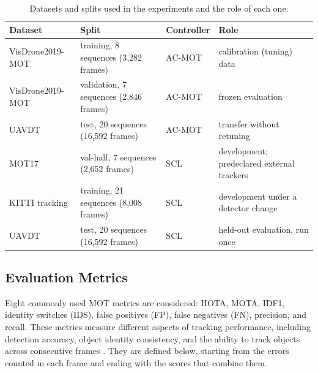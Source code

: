 \begin{table}[tbp]
\centering
\caption{Datasets and splits used in the experiments and the role of each one.}
\label{tab:res-data}
\begin{tabular}{>{\raggedright\arraybackslash}p{3.0cm}>{\raggedright\arraybackslash}p{4.8cm}>{\raggedright\arraybackslash}p{1.7cm}>{\raggedright\arraybackslash}p{4.8cm}}
\toprule
Dataset & Split & Controller & Role\\
\midrule
VisDrone2019-MOT & training, 8 sequences (3,282 frames) & AC-MOT & calibration (tuning) data\\
VisDrone2019-MOT & validation, 7 sequences (2,846 frames) & AC-MOT & frozen evaluation\\
UAVDT & test, 20 sequences (16,592 frames) & AC-MOT & transfer without retuning\\
MOT17 & val-half, 7 sequences (2,652 frames) & SCL & development; predeclared external trackers\\
KITTI tracking & training, 21 sequences (8,008 frames) & SCL & development under a detector change\\
UAVDT & test, 20 sequences (16,592 frames) & SCL & held-out evaluation, run once\\
\bottomrule
\end{tabular}
\end{table}

\subsection{Evaluation Metrics}\label{sec:res-metrics}
Eight commonly used MOT metrics are considered: HOTA, MOTA, IDF1, identity switches (IDS), false positives (FP), false negatives (FN), precision, and recall. These metrics measure different aspects of tracking performance, including detection accuracy, object identity consistency, and the ability to track objects across consecutive frames \cite{dendorfer2021motchallenge,luiten2021hota}. They are defined below, starting from the errors counted in each frame and ending with the scores that combine them.

